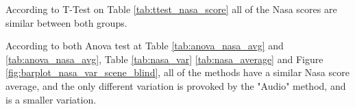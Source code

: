 According to T-Test on Table \ref{tab:ttest_nasa_score} all of the Nasa scores are similar between both groups.

According to both Anova test at Table \ref{tab:anova_nasa_avg} and \ref{tab:anova_nasa_avg}, Table \ref{tab:nasa_var} \ref{tab:nasa_average} and Figure \ref{fig:barplot_nasa_var_scene_blind}, all of the methods have a similar Nasa score average, and the only different variation is provoked by the "Audio" method, and is a smaller variation.

\FloatBarrier